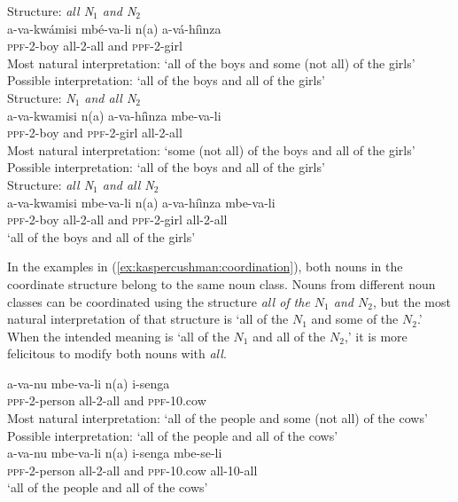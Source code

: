\documentclass[output=paper,modfonts,nonflat]{langsci/langscibook}
\begin{document}
\pagebreak
\begin{exe} 

\ex \begin{xlist} \label{ex:kaspercushman:coordination}

\ex Structure: \emph{all N$_{1}$ and N$_{2}$}\\
\gll a-va-kwámisi mbé-va-li n(a)	a-vá-hí\`inza \label{ex:kaspercushman:allboysgirls}\\  
\textsc{ppf}-2-boy all-2-all and \textsc{ppf}-2-girl \\
\glt Most natural interpretation: `all of the boys and some (not all) of the girls' \\
    Possible interpretation: `all of the boys and all of the girls' \\
\ex  Structure: \emph{N$_{1}$ and all N$_{2}$}\\
\gll a-va-kwamisi n(a) a-va-hí\`inza mbe-va-li \label{ex:kaspercushman:allgirls}  \\  
\textsc{ppf}-2-boy and \textsc{ppf}-2-girl all-2-all\\
\glt Most natural interpretation: `some (not all) of the boys and all of the girls' \\
Possible interpretation: `all of the boys and all of the girls' \\
\ex  Structure: \emph{all N$_{1}$ and all N$_{2}$} \\
\gll a-va-kwamisi mbe-va-li n(a) a-va-hí\`inza mbe-va-li  \label{ex:kaspercushman:allboysallgirls} \\  
\textsc{ppf}-2-boy all-2-all  and \textsc{ppf}-2-girl all-2-all\\
\glt `all of the boys and all of the girls' \\
\end{xlist}
\end{exe} 

In the examples in (\ref{ex:kaspercushman:coordination}), both nouns in the coordinate structure belong to the same noun class. Nouns from different noun classes can be coordinated using the structure \textit{all of the $N_{1}$ and $N_{2}$}, but the most natural interpretation of that structure is `all of the $N_{1}$ and some of the $N_{2}$.'  When the intended meaning is `all of the $N_{1}$ and all of the $N_{2}$,' it is more felicitous to modify both nouns with \textit{all}.  

\begin{exe}
\ex \begin{xlist}
\ex 
\gll a-va-nu mbe-va-li n(a) i-senga \\
\textsc{ppf}-2-person all-2-all and \textsc{ppf}-10.cow \\
\glt Most natural interpretation: `all of the people and some (not all) of the cows' \\
Possible interpretation: `all of the people and all of the cows' \\
\ex 
\gll a-va-nu mbe-va-li n(a) i-senga mbe-se-li \\
\textsc{ppf}-2-person all-2-all and \textsc{ppf}-10.cow all-10-all \\
\glt `all of the people and all of the cows' 
\end{xlist}
\end{exe}
\end{document}
